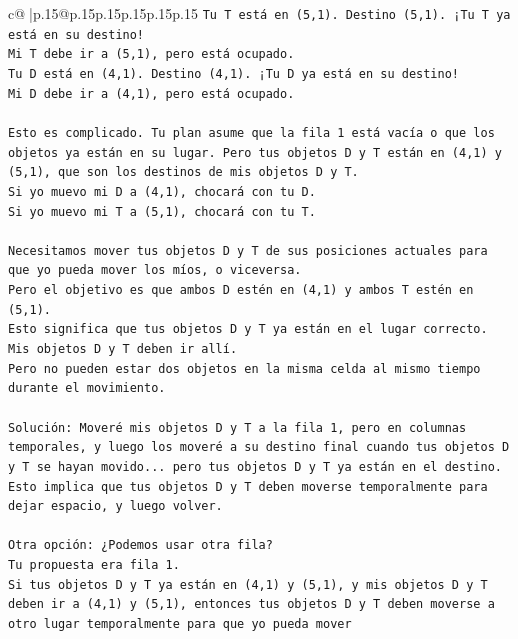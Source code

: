 \documentclass{article}
\begin{document}
{\begin{supertabular}{c@{$\;$}|p{.15\linewidth}@{}p{.15\linewidth}p{.15\linewidth}p{.15\linewidth}p{.15\linewidth}p{.15\linewidth}}
{{{\texttt{Tu T está en (5,1). Destino (5,1). ¡Tu T ya está en su destino!} \\
\texttt{Mi T debe ir a (5,1), pero está ocupado.} \\
\texttt{Tu D está en (4,1). Destino (4,1). ¡Tu D ya está en su destino!} \\
\texttt{Mi D debe ir a (4,1), pero está ocupado.} \\
\\ 
\texttt{Esto es complicado. Tu plan asume que la fila 1 está vacía o que los objetos ya están en su lugar. Pero tus objetos D y T están en (4,1) y (5,1), que son los destinos de mis objetos D y T.} \\
\texttt{Si yo muevo mi D a (4,1), chocará con tu D.} \\
\texttt{Si yo muevo mi T a (5,1), chocará con tu T.} \\
\\ 
\texttt{Necesitamos mover tus objetos D y T de sus posiciones actuales para que yo pueda mover los míos, o viceversa.} \\
\texttt{Pero el objetivo es que ambos D estén en (4,1) y ambos T estén en (5,1).} \\
\texttt{Esto significa que tus objetos D y T ya están en el lugar correcto. Mis objetos D y T deben ir allí.} \\
\texttt{Pero no pueden estar dos objetos en la misma celda al mismo tiempo durante el movimiento.} \\
\\ 
\texttt{Solución: Moveré mis objetos D y T a la fila 1, pero en columnas temporales, y luego los moveré a su destino final cuando tus objetos D y T se hayan movido... pero tus objetos D y T ya están en el destino.} \\
\texttt{Esto implica que tus objetos D y T deben moverse temporalmente para dejar espacio, y luego volver.} \\
\\ 
\texttt{Otra opción: ¿Podemos usar otra fila?} \\
\texttt{Tu propuesta era fila 1.} \\
\texttt{Si tus objetos D y T ya están en (4,1) y (5,1), y mis objetos D y T deben ir a (4,1) y (5,1), entonces tus objetos D y T deben moverse a otro lugar temporalmente para que yo pueda mover} \\
            }
        }
    }
     \\ \\


\end{supertabular}}
\end{document}
